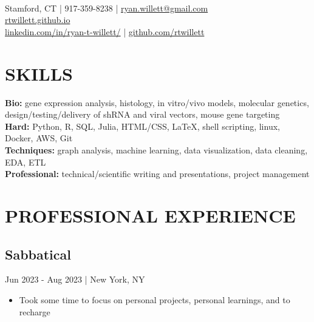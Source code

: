 \documentclass[11pt]{article}
\title{\vspace{-7cm}}
\date{}
\author{Ryan Willett}
\newenvironment{myitemize}
{ \begin{itemize}
	\setlength{\itemsep}{0pt}
	\setlength{\parskip}{0pt}
	\setlength{\parsep}{0pt}     }
{ \end{itemize}                  }
\begin{document}
\maketitle

\section*{}
  \\
\normalsize
Stamford, CT | 917-359-8238 | \href{mailto:ryan.willett@gmail.com}{ryan.willett@gmail.com} \\
\href{http://rtwillett.github.io}{rtwillett.github.io} \\
\href{https://linkedin.com/in/ryan-t-willett/}{linkedin.com/in/ryan-t-willett/} | \href{https://github.com/rtwillett}{github.com/rtwillett}

\raggedright
\vspace{-3truemm}


\section*{SKILLS}
\vspace{-3truemm}
{\bfseries Bio:} gene expression analysis, histology, in vitro/vivo models, molecular genetics, design/testing/delivery of shRNA and viral vectors, mouse gene targeting \\
{\bfseries Hard:} Python, R, SQL, Julia, HTML/CSS, \LaTeX, shell scripting, linux, Docker, AWS, Git \\
{\bfseries Techniques:} graph analysis, machine learning, data visualization, data cleaning, EDA, ETL \\
{\bfseries Professional:} technical/scientific writing and presentations, project management

\section*{PROFESSIONAL EXPERIENCE}

\subsection*{Sabbatical}
\vspace{-3truemm}

{\bfseries}Jun 2023 - Aug 2023 | New York, NY
\begin{myitemize}
	\item Took some time to focus on personal projects, personal learnings, and to recharge
\end{myitemize}
\end{document}
